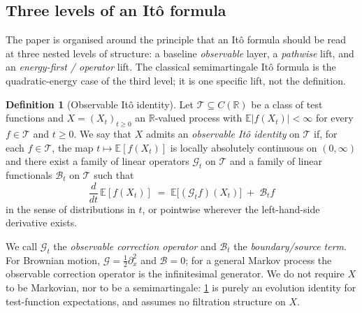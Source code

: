 \documentclass[11pt,reqno]{amsart}
\theoremstyle{plain}
\theoremstyle{definition}
\newtheorem{definition}[theorem]{Definition}
\theoremstyle{remark}
\newcommand{\R}{\mathbb{R}}
\newcommand{\E}{\mathbb{E}}
\begin{document}
\subsection*{Three levels of an It\^o formula}\label{sec:three-levels}

The paper is organised around the principle that an It\^o formula
should be read at three nested levels of structure: a baseline
\emph{observable} layer, a \emph{pathwise} lift, and an
\emph{energy-first / operator} lift. The classical semimartingale
It\^o formula is the quadratic-energy case of the third level; it
is one specific lift, not the definition.

\begin{definition}[Observable It\^o identity]\label{def:obs-ito-identity}
Let $\mathcal T\subseteq C(\R)$ be a class of test functions and
$X=(X_t)_{t\ge 0}$ an $\R$-valued process with
$\E|f(X_t)|<\infty$ for every $f\in\mathcal T$ and $t\ge 0$. We
say that $X$ admits an \emph{observable It\^o identity} on
$\mathcal T$ if, for each $f\in\mathcal T$, the map
$t\mapsto\E[f(X_t)]$ is locally absolutely continuous on
$(0,\infty)$ and there exist a family of linear operators
$\mathcal G_t$ on $\mathcal T$ and a family of linear functionals
$\mathcal B_t$ on $\mathcal T$ such that
\begin{equation}\label{eq:obs-ito-identity}
  \frac{d}{dt}\,\E[f(X_t)]
   \;=\;\E\bigl[(\mathcal G_t f)(X_t)\bigr]
   \;+\;\mathcal B_t f
\end{equation}
in the sense of distributions in $t$, or pointwise wherever the
left-hand-side derivative exists.
\end{definition}

We call $\mathcal G_t$ the \emph{observable correction operator}
and $\mathcal B_t$ the \emph{boundary/source term}. For Brownian
motion, $\mathcal G=\tfrac12\partial_x^{2}$ and $\mathcal B=0$; for
a general Markov process the observable correction operator is the
infinitesimal generator. We do not require $X$ to be Markovian, nor
to be a semimartingale: \cref{def:obs-ito-identity} is purely an
evolution identity for test-function expectations, and assumes no
filtration structure on $X$.
\end{document}
